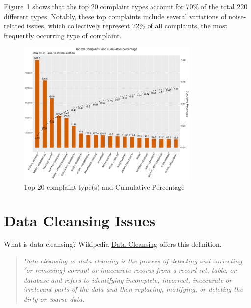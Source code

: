 \documentclass[linenumber]{jdsart}
\begin{document}
Figure~\ref{fig:SR_complaints} shows that the top 20 complaint 
types account for 70\% of the total 220 different types. Notably, 
these top complaints include several variations of noise-related 
issues, which collectively represent 22\% of all complaints, the 
most frequently occurring type of complaint.

\begin{figure}[tbp]
 \centering
  \includegraphics[width=0.8\textwidth]{SR_by_Complaint_Type.pdf} 
  \caption{Top 20 complaint type(s) and Cumulative Percentage} 
  \label{fig:SR_complaints}
\end{figure}


\section{Data Cleansing Issues} 
\label{sec:issues}
What is data cleansing?  Wikipedia 
\href{https://en.wikipedia.org/wiki/Data_cleansing}{Data Cleansing} 
offers this definition. 

\begin{quote}\textit{Data cleansing or data cleaning is the process of detecting and 
correcting (or removing) corrupt or inaccurate records from a record set, 
table, or database and refers to identifying incomplete, incorrect, 
inaccurate or irrelevant parts of the data and then replacing, 
modifying, or deleting the dirty or coarse data.}
\end{quote}
\end{document}
